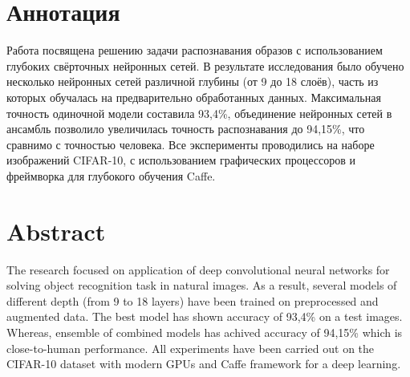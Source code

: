 \section*{Аннотация}
Работа посвящена решению задачи распознавания образов с использованием глубоких свёрточных 
нейронных сетей. В результате исследования было обучено несколько нейронных сетей различной глубины 
(от 9 до 18 слоёв), часть из которых обучалась на предварительно обработанных данных. Максимальная 
точность одиночной модели составила 93,4\%, объединение нейронных сетей в ансамбль позволило
увеличилась точность распознавания до 94,15\%, что сравнимо с точностью человека. Все эксперименты 
проводились на наборе изображений CIFAR-10, с использованием графических процессоров и фреймворка
для глубокого обучения Caffe.

\section*{Abstract}
The research focused on application of deep convolutional neural networks for
solving object recognition task in natural images. As a result, several models of different depth
(from 9 to 18 layers) have been trained on preprocessed and augmented data. The best model has shown accuracy 
of 93,4\% on a test images. Whereas, ensemble of combined models has achived accuracy of 94,15\% which is 
close-to-human performance. All experiments have been carried out on the CIFAR-10 dataset with modern GPUs
and Caffe framework for a deep learning.